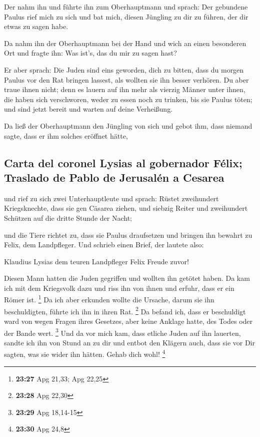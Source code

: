  Der nahm ihn und führte ihn zum Oberhauptmann und
sprach: Der gebundene Paulus rief mich zu sich und bat mich, diesen
Jüngling zu dir zu führen, der dir etwas zu sagen habe.

 Da nahm ihn der Oberhauptmann bei der Hand und wich an
einen besonderen Ort und fragte ihn: Was ist's, das du mir zu sagen
hast?

 Er aber sprach: Die Juden sind eins geworden, dich zu
bitten, dass du morgen Paulus vor den Rat bringen lassest, als wollten
sie ihn besser verhören.  Du aber traue ihnen nicht; denn
es lauern auf ihn mehr als vierzig Männer unter ihnen, die haben sich
verschworen, weder zu essen noch zu trinken, bis sie Paulus töten; und
sind jetzt bereit und warten auf deine Verheißung.

 Da ließ der Oberhauptmann den Jüngling von sich und
gebot ihm, dass niemand sagte, dass er ihm solches eröffnet hätte,

\hypertarget{carta-del-coronel-lysias-al-gobernador-fuxe9lix-traslado-de-pablo-de-jerusaluxe9n-a-cesarea}{%
\subsection{Carta del coronel Lysias al gobernador Félix; Traslado de
Pablo de Jerusalén a
Cesarea}\label{carta-del-coronel-lysias-al-gobernador-fuxe9lix-traslado-de-pablo-de-jerusaluxe9n-a-cesarea}}

 und rief zu sich zwei Unterhauptleute und sprach: Rüstet
zweihundert Kriegsknechte, dass sie gen Cäsarea ziehen, und siebzig
Reiter und zweihundert Schützen auf die dritte Stunde der Nacht;

 und die Tiere richtet zu, dass sie Paulus draufsetzen
und bringen ihn bewahrt zu Felix, dem Landpfleger.  Und
schrieb einen Brief, der lautete also:

 Klaudius Lysias dem teuren Landpfleger Felix Freude
zuvor!

 Diesen Mann hatten die Juden gegriffen und wollten ihn
getötet haben. Da kam ich mit dem Kriegsvolk dazu und riss ihn von ihnen
und erfuhr, dass er ein Römer ist. \footnote{\textbf{23:27} Apg 21,33;
  Apg 22,25}  Da ich aber erkunden wollte die Ursache,
darum sie ihn beschuldigten, führte ich ihn in ihren Rat. \footnote{\textbf{23:28}
  Apg 22,30}  Da befand ich, dass er beschuldigt ward von
wegen Fragen ihres Gesetzes, aber keine Anklage hatte, des Todes oder
der Bande wert. \footnote{\textbf{23:29} Apg 18,14-15} 
Und da vor mich kam, dass etliche Juden auf ihn lauerten, sandte ich ihn
von Stund an zu dir und entbot den Klägern auch, dass sie vor Dir
sagten, was sie wider ihn hätten. Gehab dich wohl! \footnote{\textbf{23:30}
  Apg 24,8}


